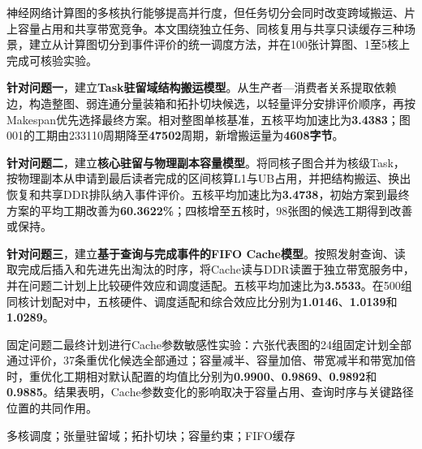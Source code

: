 \noindent\hspace*{2em}神经网络计算图的多核执行能够提高并行度，但任务切分会同时改变跨域搬运、片上容量占用和共享带宽竞争。本文围绕独立任务、同核复用与共享只读缓存三种场景，建立从计算图切分到事件评价的统一调度方法，并在100张计算图、1至5核上完成可核验实验。

\textbf{针对问题一}，建立\textbf{Task驻留域结构搬运模型}。从生产者—消费者关系提取依赖边，构造整图、弱连通分量装箱和拓扑切块候选，以轻量评分安排评价顺序，再按Makespan优先选择最终方案。相对整图单核基准，五核平均加速比为\textbf{3.4383}；图001的工期由233110周期降至\textbf{47502}周期，新增搬运量为\textbf{4608字节}。

\textbf{针对问题二}，建立\textbf{核心驻留与物理副本容量模型}。将同核子图合并为核级Task，按物理副本从申请到最后读者完成的区间核算L1与UB占用，并把结构搬运、换出恢复和共享DDR排队纳入事件评价。五核平均加速比为\textbf{3.4738}，初始方案到最终方案的平均工期改善为\textbf{60.3622\%}；四核增至五核时，98张图的候选工期得到改善或保持。

\textbf{针对问题三}，建立\textbf{基于查询与完成事件的FIFO Cache模型}。按照发射查询、读取完成后插入和先进先出淘汰的时序，将Cache读与DDR读置于独立带宽服务中，并在问题二计划上比较硬件效应和调度适配。五核平均加速比为\textbf{3.5533}。在500组同核计划配对中，五核硬件、调度适配和综合效应比分别为\textbf{1.0146}、\textbf{1.0139}和\textbf{1.0289}。

固定问题二最终计划进行Cache参数敏感性实验：六张代表图的24组固定计划全部通过评价，37条重优化候选全部通过；容量减半、容量加倍、带宽减半和带宽加倍时，重优化工期相对默认配置的均值比分别为\textbf{0.9900}、\textbf{0.9869}、\textbf{0.9892}和\textbf{0.9885}。结果表明，Cache参数变化的影响取决于容量占用、查询时序与关键路径位置的共同作用。

多核调度；张量驻留域；拓扑切块；容量约束；FIFO缓存
